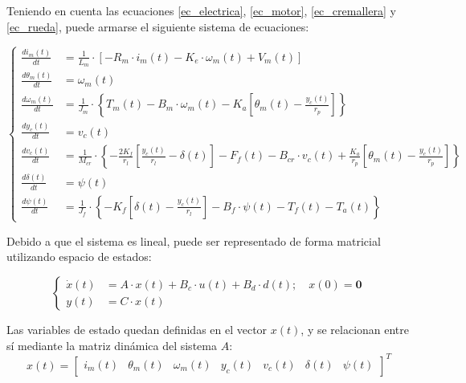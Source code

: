 \documentclass{article}
\begin{document}
Teniendo en cuenta las ecuaciones \ref{ec_electrica}, \ref{ec_motor}, \ref{ec_cremallera} y \ref{ec_rueda}, puede armarse el siguiente sistema de ecuaciones:


\begin{equation}
\left\{
\begin{aligned}
\frac{di_m(t)}{dt} &= \frac{1}{L_m} \cdot  \left[-R_m \cdot i_m(t) - K_e \cdot \omega_m(t) + V_m(t) \right] \\
\frac{d\theta_m(t)}{dt} &= \omega_m(t) \\
\frac{d\omega_m(t)}{dt} &= \frac{1}{J_m} \cdot \left\{T_m(t) - B_m \cdot \omega_m(t) - K_{a} \left[ \theta_m(t) - \frac{y_c(t)}{r_p} \right] \right\} \\
\frac{dy_c(t)}{dt} &= v_c(t) \\
\frac{dv_c(t)}{dt} &= \frac{1}{M_{cr}} \cdot \left\{ -\frac{2 K_f}{r_l} \left[ \frac{y_c(t)}{r_l} - \delta(t) \right] - F_f(t) - B_{cr} \cdot v_c(t) + \frac{K_a}{r_p} \left[ \theta_m(t) - \frac{y_c(t)}{r_p} \right] \right\} \\
\frac{d\delta(t)}{dt} &= \psi(t) \\
\frac{d\psi(t)}{dt} &= \frac{1}{J_f} \cdot \left\{ -K_f \left[ \delta(t) - \frac{y_c(t)}{r_l} \right] - B_f \cdot \psi(t) - T_f(t) - T_a(t) \right\}
\end{aligned}
\right.
\label{sistema_completo}
\end{equation}

Debido a que el sistema es lineal, puede ser representado de forma matricial utilizando espacio de estados:

\begin{equation}
\left\{
\begin{aligned}
\dot{x}(t) &= A \cdot x(t) + B_c \cdot u(t) + B_d \cdot d(t) ;\quad x(0) = \mathbf{0}\\
y(t) &= C \cdot x(t)
\end{aligned}
\right.
\label{ec_SS}
\end{equation}

Las variables de estado quedan definidas en el vector $x(t)$, y se relacionan entre sí mediante la matriz dinámica del sistema $A$:
\begin{equation*}
x(t) =
\begin{bmatrix}
i_m(t) &
\theta_m(t) &
\omega_m(t) &
y_c(t) &
v_c(t) &
\delta(t) &
\psi(t)
\end{bmatrix}^T
\end{equation*}
\end{document}
